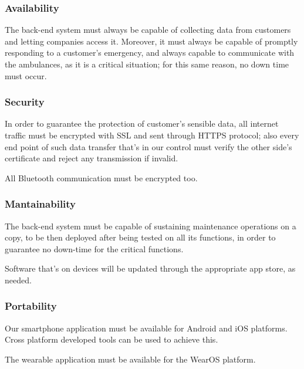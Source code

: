 \documentclass[../main.tex]{subfiles}
\begin{document}
\subsubsection{Availability}

The back-end system must always be capable of collecting data from customers and letting companies access it. Moreover, it must always be capable of promptly responding to a customer's emergency, and always capable to communicate with the ambulances, as it is a critical situation; for this same reason, no down time must occur.

\subsubsection{Security}

In order to guarantee the protection of customer's sensible data, all internet traffic must be encrypted with SSL and sent through HTTPS protocol; also every end point of such data transfer that's in our control must verify the other side's certificate and reject any transmission if invalid.

All Bluetooth communication must be encrypted too.

\subsubsection{Mantainability}

The back-end system must be capable of sustaining maintenance operations on a copy, to be then deployed after being tested on all its functions, in order to guarantee no down-time for the critical functions.

Software that's on devices will be updated through the appropriate app store, as needed.

\subsubsection{Portability}

Our smartphone application must be available for Android and iOS platforms. Cross platform developed tools can be used to achieve this.

The wearable application must be available for the WearOS platform.
\end{document}
